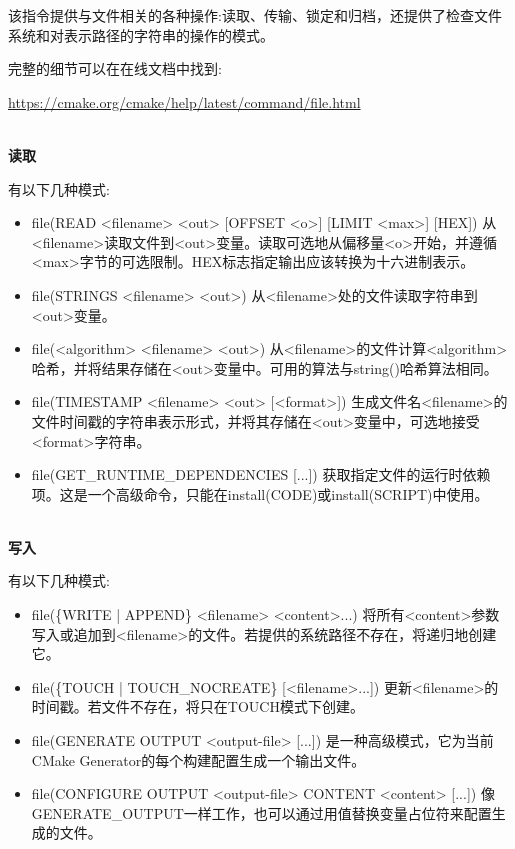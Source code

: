 该指令提供与文件相关的各种操作:读取、传输、锁定和归档，还提供了检查文件系统和对表示路径的字符串的操作的模式。

完整的细节可以在在线文档中找到:

\url{https://cmake.org/cmake/help/latest/command/file.html}

\hspace*{\fill} \\ %
\noindent
\textbf{读取}

有以下几种模式:

\begin{itemize}
\item 
file(READ <filename> <out> [OFFSET <o>] [LIMIT <max>] [HEX]) 从<filename>读取文件到<out>变量。读取可选地从偏移量<o>开始，并遵循<max>字节的可选限制。HEX标志指定输出应该转换为十六进制表示。

\item 
file(STRINGS <filename> <out>) 从<filename>处的文件读取字符串到<out>变量。

\item 
file(<algorithm> <filename> <out>) 从<filename>的文件计算<algorithm>哈希，并将结果存储在<out>变量中。可用的算法与string()哈希算法相同。

\item 
file(TIMESTAMP <filename> <out> [<format>]) 生成文件名<filename>的文件时间戳的字符串表示形式，并将其存储在<out>变量中，可选地接受<format>字符串。

\item 
file(GET\_RUNTIME\_DEPENDENCIES [...]) 获取指定文件的运行时依赖项。这是一个高级命令，只能在install(CODE)或install(SCRIPT)中使用。
\end{itemize}


\hspace*{\fill} \\ %
\noindent
\textbf{写入}

有以下几种模式:

\begin{itemize}
\item 
file(\{WRITE | APPEND\} <filename> <content>...) 将所有<content>参数写入或追加到<filename>的文件。若提供的系统路径不存在，将递归地创建它。

\item 
file(\{TOUCH | TOUCH\_NOCREATE\} [<filename>...]) 更新<filename>的时间戳。若文件不存在，将只在TOUCH模式下创建。

\item 
file(GENERATE OUTPUT <output-file> [...]) 是一种高级模式，它为当前CMake Generator的每个构建配置生成一个输出文件。

\item 
file(CONFIGURE OUTPUT <output-file> CONTENT <content> [...]) 像GENERATE\_OUTPUT一样工作，也可以通过用值替换变量占位符来配置生成的文件。
\end{itemize}


